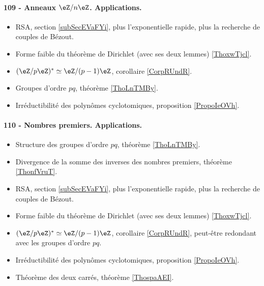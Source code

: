 \paragraph{109 - Anneaux $\eZ/n\eZ$. Applications.}
\begin{itemize}
    \item RSA, section \ref{subSecEVaFYi}, plus l'exponentielle rapide, plus la recherche de couples de Bézout.
    \item Forme faible du théorème de Dirichlet (avec ses deux lemmes) \ref{ThoxwTjcl}.
    \item \( (\eZ/p\eZ)^*\simeq \eZ/(p-1)\eZ\), corollaire \ref{CorpRUndR}.
    \item Groupes d'ordre \( pq\), théorème \ref{ThoLnTMBy}.
    \item Irréductibilité des polynômes cyclotomiques, proposition \ref{PropoIeOVh}.
\end{itemize}

\paragraph{110 - Nombres premiers. Applications.}
\begin{itemize}
    \item Structure des groupes d'ordre \( pq\), théorème \ref{ThoLnTMBy}.
    \item Divergence de la somme des inverses des nombres premiers, théorème \ref{ThonfVruT}.
    \item RSA, section \ref{subSecEVaFYi}, plus l'exponentielle rapide, plus la recherche de couples de Bézout.
    \item Forme faible du théorème de Dirichlet (avec ses deux lemmes) \ref{ThoxwTjcl}.
    \item \( (\eZ/p\eZ)^*\simeq \eZ/(p-1)\eZ\), corollaire \ref{CorpRUndR}, peut-être redondant avec les groupes d'ordre \( pq\).
    \item Irréductibilité des polynômes cyclotomiques, proposition \ref{PropoIeOVh}.
    \item Théorème des deux carrés, théorème \ref{ThospaAEI}.
\end{itemize}

